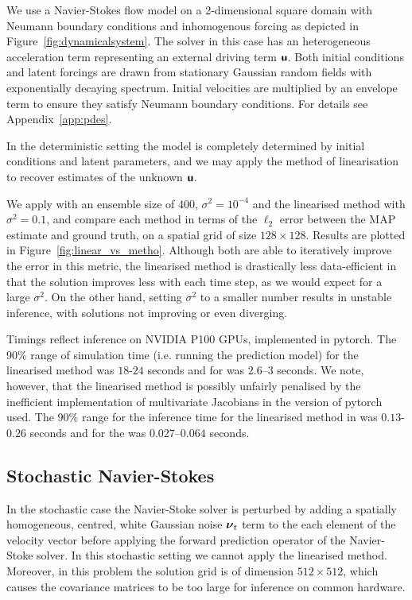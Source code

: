 \documentclass{article}
\theoremstyle{plain}
\theoremstyle{definition}
\theoremstyle{remark}
\begin{document}
We use a Navier-Stokes flow model on a 2-dimensional square domain with Neumann boundary conditions and inhomogenous forcing as depicted in Figure~\ref{fig:dynamicalsystem}.
The solver in this case has an heterogeneous acceleration term representing an external driving term \(\boldsymbol{\mathsf{\boldsymbol{\mathsf{u}}}}\).
Both initial conditions and latent forcings are drawn from stationary Gaussian random fields with exponentially decaying spectrum.
Initial velocities are multiplied by an envelope term to ensure they satisfy Neumann boundary conditions.
For details see Appendix~\ref{app:pdes}.

In the deterministic setting the model is completely determined by initial conditions and latent parameters, and we may apply the method of linearisation to recover estimates of the unknown \(\boldsymbol{\mathsf{\boldsymbol{\mathsf{u}}}}\).

We apply \meth{} with an ensemble size of 400, \(\sigma^2=10^{-4}\) and the linearised method with \(\sigma^2=0.1\), and compare each method in terms of the \(\ell_2\) error between the MAP estimate and ground truth, on a spatial grid of size \(128\times 128\).
Results are plotted in Figure~\ref{fig:linear_vs_metho}.
Although both are able to iteratively improve the error in this metric, the linearised method is drastically less data-efficient in that the solution improves less with each time step, as we would expect for a large \(\sigma^2\).
On the other hand, setting \(\sigma^2\) to a smaller number results in unstable inference, with solutions not improving or even diverging.

Timings reflect inference on NVIDIA P100 GPUs, implemented in pytorch.
The 90\% range of simulation time (i.e. running the prediction model) for the linearised method was $18$-$24$ seconds and for \meth{} was $2.6$--$3$ seconds.
We note, however, that the linearised method is possibly unfairly penalised by the inefficient implementation of multivariate Jacobians in the version of pytorch used.
The 90\% range for the inference time for the linearised method in was $0.13$-$0.26$ seconds and for the \meth{} was $0.027$--$0.064$ seconds.

\subsection{Stochastic Navier-Stokes}

In the stochastic case the Navier-Stoke solver is perturbed by adding a spatially homogeneous, centred, white Gaussian noise \(\boldsymbol{\mathsf{\nu}}_t\) term to the each element of the velocity vector before applying the forward prediction operator of the Navier-Stoke solver.
In this stochastic setting we cannot apply the linearised method.
Moreover, in this problem the solution grid is of dimension \(512 \times 512\), which causes the covariance matrices to be too large for inference on common hardware.
\end{document}
